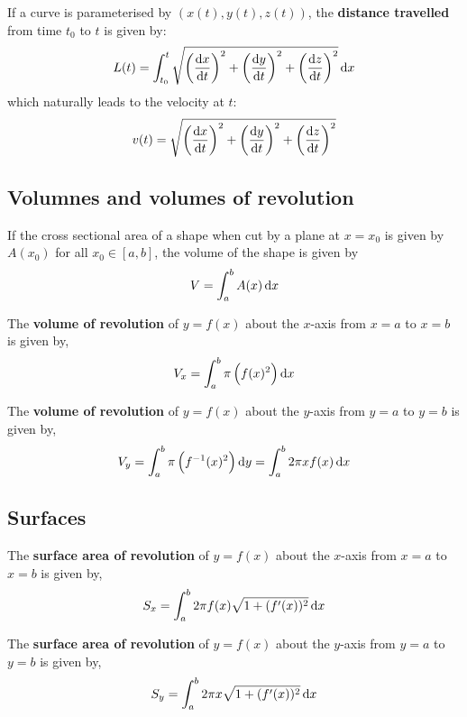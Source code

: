 \documentclass[../Year1.tex]{subfiles}
\begin{document}
\begin{theorem}
    If a curve is parameterised by $(x(t),y(t),z(t))$, the \textbf{distance travelled} from time $t_0$ to $t$ is given by: \[
        L(t) = \intd{t_0}{t}{\sqrt{\br{\frac{\dif x}{\dif t}}^2+\br{\frac{\dif y}{\dif t}}^2+\br{\frac{\dif z}{\dif t}}^2}}{x}
    \] which naturally leads to the velocity at $t$: \[
        v(t) = \sqrt{\br{\frac{\dif x}{\dif t}}^2+\br{\frac{\dif y}{\dif t}}^2+\br{\frac{\dif z}{\dif t}}^2}
    \]
\end{theorem}

\subsection{Volumnes and volumes of revolution}

\begin{theorem}[Volume]
    If the cross sectional area of a shape when cut by a plane at $x=x_0$ is given by $A(x_0)$ for all $x_0\in[a,b]$, the volume of the shape is given by \[
        V = \intd{a}{b}{A(x)}{x}
    \]
\end{theorem}

\begin{theorem}
    The \textbf{volume of revolution} of $y=f(x)$ about the $x$-axis from $x=a$ to $x=b$ is given by, \[
        V_x = \intd{a}{b}{\pi\br{f(x)^2}}{x}
    \]
\end{theorem}

\begin{theorem}
    The \textbf{volume of revolution} of $y=f(x)$ about the $y$-axis from $y=a$ to $y=b$ is given by, \[
        V_y = \intd{a}{b}{\pi\br{f^{-1}(x)^2}}{y} = \intd{a}{b}{2\pi xf(x)}{x}
    \]
\end{theorem}

\subsection{Surfaces}

\begin{theorem}
    The \textbf{surface area of revolution} of $y=f(x)$ about the $x$-axis from $x=a$ to $x=b$ is given by, \[
        S_x = \intd{a}{b}{2\pi f(x)\sqrt{1+(f'(x))^2}}{x}
    \]
\end{theorem}

\begin{theorem}
    The \textbf{surface area of revolution} of $y=f(x)$ about the $y$-axis from $y=a$ to $y=b$ is given by, \[
        S_y = \intd{a}{b}{2\pi x\sqrt{1+(f'(x))^2}}{x}
    \]
\end{theorem}
\end{document}
